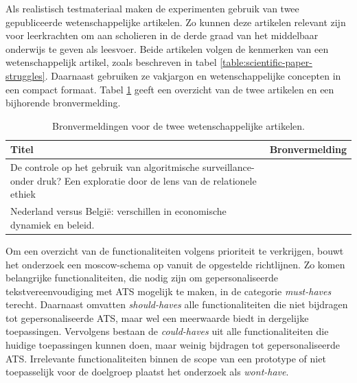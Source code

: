 Als realistisch testmateriaal maken de experimenten gebruik van twee gepubliceerde wetenschappelijke artikelen. Zo kunnen deze artikelen relevant zijn voor leerkrachten om aan scholieren in de derde graad van het middelbaar onderwijs te geven als leesvoer. Beide artikelen volgen de kenmerken van een wetenschappelijk artikel, zoals beschreven in tabel \ref{table:scientific-paper-struggles}. Daarnaast gebruiken ze vakjargon en wetenschappelijke concepten in een compact formaat. Tabel \ref{table:referentieteksten-bronvermelding} geeft een overzicht van de twee artikelen en een bijhorende bronvermelding.

\begin{center}
	\begin{table}[H]
		\begin{tabular}{ | m{10cm} | m{5cm} | } 
			\hline
			\textbf{Titel} & \textbf{Bronvermelding} \\
			\hline
			De controle op het gebruik van algoritmische surveillance- onder druk? Een exploratie door de lens van de relationele ethiek & \autocite{VanBrakel2022} \\
			\hline
			Nederland versus België: verschillen in economische dynamiek en beleid. & \autocite{Sleuwaegen2022} \\
			\hline
		\end{tabular}
		\caption{Bronvermeldingen voor de twee wetenschappelijke artikelen.}
		\label{table:referentieteksten-bronvermelding}
	\end{table}
\end{center}

Om een overzicht van de functionaliteiten volgens prioriteit te verkrijgen, bouwt het onderzoek een moscow-schema op vanuit de opgestelde richtlijnen. Zo komen belangrijke functionaliteiten, die nodig zijn om gepersonaliseerde tekstvereenvoudiging met ATS mogelijk te maken, in de categorie \textit{must-haves} terecht. Daarnaast omvatten \textit{should-haves} alle functionaliteiten die niet bijdragen tot gepersonaliseerde ATS, maar wel een meerwaarde biedt in dergelijke toepassingen. Vervolgens bestaan de \textit{could-haves} uit alle functionaliteiten die huidige toepassingen kunnen doen, maar weinig bijdragen tot gepersonaliseerde ATS. Irrelevante functionaliteiten binnen de scope van een prototype of niet toepasselijk voor de doelgroep plaatst het onderzoek als \textit{wont-have}.

